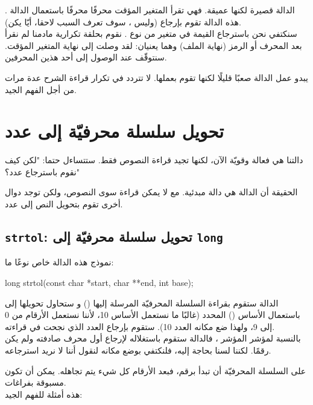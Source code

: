 الدالة
قصيرة لكنها عميقة. فهي تقرأ المتغير المؤقت محرفًا محرفًا باستعمال الدالة
.
هذه الدالة تقوم بإرجاع
(وليس
،
سوف تعرف السبب لاحقا، أيّا يكن).\\
سنكتفي نحن باسترجاع القيمة في متغير
من نوع
.
نقوم بحلقة تكرارية مادمنا لم نقرأ بعد المحرف
 أو الرمز
(نهاية الملف) وهما يعنيان: لقد وصلت إلى نهاية المتغير المؤقت. سنتوقّف عند الوصول إلى أحد هذين المحرفين.

يبدو عمل الدالة
صعبًا قليلًا لكنها تقوم بعملها. لا تتردد في تكرار قراءة الشرح عدة مرات من أجل الفهم الجيد.

\section{تحويل سلسلة محرفيّة إلى عدد}

دالتنا
هي فعالة وقويّة الآن، لكنها تجيد قراءة النصوص فقط. ستتساءل حتما: "لكن كيف نقوم باسترجاع عدد؟"

الحقيقة أن الدالة
هي دالة مبدئية. مع
لا يمكن قراءة سوى النصوص، ولكن توجد دوال أخرى تقوم بتحويل النص إلى عدد.

\subsection{\texttt{strtol}: تحويل سلسلة محرفيّة إلى \texttt{long}}

نموذج هذه الدالة خاص نوعًا ما:

\begin{Csource}
long strtol(const char *start, char **end, int base);
\end{Csource}

الدالة ستقوم بقراءة السلسلة المحرفيّة المرسلة إليها
()
و ستحاول تحويلها إلى
باستعمال الأساس
()
المحدد (غالبًا ما نستعمل الأساس 10، لأننا نستعمل الأرقام من 0 إلى 9، ولهذا ضع مكانه العدد 10). ستقوم بإرجاع العدد الذي نجحت في قراءته.\\
بالنسبة لمؤشر المؤشر
،
فالدالة ستقوم باستغلاله لإرجاع أول محرف صادفته ولم يكن رقمًا. لكننا لسنا بحاجة إليه، فلنكتفي بوضع
مكانه لنقول أننا لا نريد استرجاعه.

على السلسلة المحرفيّة أن تبدأ برقم، فبعد الأرقام كل شيء يتم تجاهله. يمكن أن تكون مسبوقة بفراغات.\\
هذه أمثلة للفهم الجيد:

